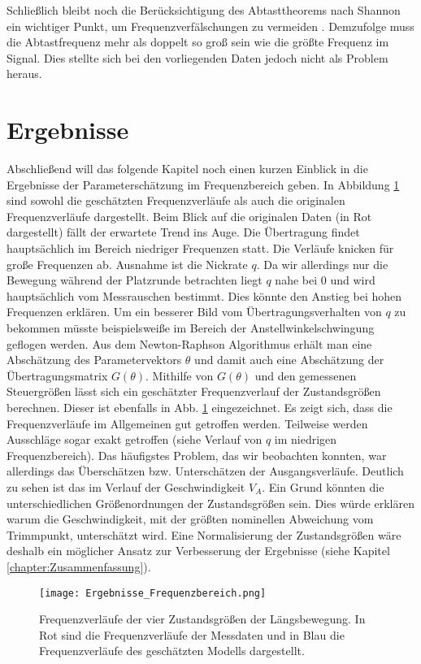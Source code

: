 Schließlich bleibt noch die Berücksichtigung des Abtasttheorems nach Shannon ein wichtiger Punkt, um Frequenzverfälschungen 
zu vermeiden \cite{Grimm2017}. Demzufolge muss die Abtastfrequenz mehr als doppelt so groß sein wie die größte Frequenz im 
Signal. Dies stellte sich bei den vorliegenden Daten jedoch nicht als Problem heraus.

\section{Ergebnisse}

Abschließend will das folgende Kapitel noch einen kurzen Einblick in die Ergebnisse der Parameterschätzung im Frequenzbereich geben. In Abbildung \ref{fig:Ergebnisse_f} sind sowohl die geschätzten Frequenzverläufe als auch die originalen Frequenzverläufe dargestellt. Beim Blick auf die originalen Daten (in Rot dargestellt) fällt der erwartete Trend ins Auge. Die Übertragung findet hauptsächlich im Bereich niedriger Frequenzen statt. Die Verläufe knicken für große Frequenzen ab. Ausnahme ist die Nickrate $q$. Da wir allerdings nur die Bewegung während der Platzrunde betrachten liegt $q$ nahe bei 0 und wird hauptsächlich vom Messrauschen bestimmt. Dies könnte den Anstieg bei hohen Frequenzen erklären. Um ein besserer Bild vom Übertragungsverhalten von $q$ zu bekommen müsste beispielsweiße im Bereich der Anstellwinkelschwingung geflogen werden. Aus dem Newton-Raphson Algorithmus erhält man eine Abschätzung des Parametervektors $\theta$ und damit auch eine Abschätzung der Übertragungsmatrix $G(\theta)$. Mithilfe von $G(\theta)$ und den gemessenen Steuergrößen lässt sich ein geschätzter Frequenzverlauf der Zustandsgrößen berechnen. Dieser ist ebenfalls in Abb. \ref{fig:Ergebnisse_f} eingezeichnet. Es zeigt sich, dass die Frequenzverläufe im Allgemeinen gut getroffen werden. Teilweise werden Ausschläge sogar exakt getroffen (siehe Verlauf von $q$ im niedrigen Frequenzbereich). Das häufigstes Problem, das wir beobachten konnten, war allerdings das Überschätzen bzw. Unterschätzen der Ausgangsverläufe. Deutlich zu sehen ist das im Verlauf der Geschwindigkeit $V_{A}$. Ein Grund könnten die unterschiedlichen Größenordnungen der Zustandsgrößen sein. Dies würde erklären warum die Geschwindigkeit, mit der größten nominellen Abweichung vom Trimmpunkt, unterschätzt wird. Eine Normalisierung der Zustandsgrößen wäre deshalb ein möglicher Ansatz zur Verbesserung der Ergebnisse (siehe Kapitel \ref{chapter:Zusammenfassung}). 

\begin{figure}[h!]
	\centering
	\texttt{[image: Ergebnisse\_Frequenzbereich.png]}
	\caption{Frequenzverläufe der vier Zustandsgrößen der Längsbewegung. In Rot sind die Frequenzverläufe der Messdaten und in Blau die Frequenzverläufe des geschätzten Modells dargestellt.}
	\label{fig:Ergebnisse_f}
\end{figure}

